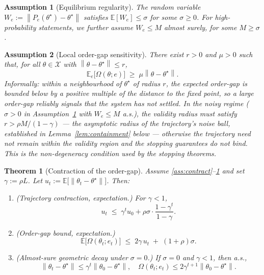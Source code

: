\documentclass[10pt,a4paper]{amsart}
\newtheorem{assumption}{Assumption}
\newtheorem{theorem}{Theorem}
\newcommand{\Ogap}{\Omega}
\newcommand{\X}{\mathcal{X}}
\newcommand{\norm}[1]{\left\lVert#1\right\rVert}
\begin{document}
\begin{assumption}[Equilibrium regularity]
\label{ass:equilibrium}
The random variable $W_e := \norm{P_e(\theta^\star) - \theta^\star}$
satisfies $\mathbb{E}[W_e] \leq \sigma$ for some $\sigma \geq 0$. For
high-probability statements, we further assume $W_e \leq M$ almost surely,
for some $M \geq \sigma$.
\end{assumption}

\begin{assumption}[Local order-gap sensitivity]
\label{ass:nondeg}
There exist $r > 0$ and $\mu > 0$ such that, for all $\theta \in \X$ with
$\norm{\theta - \theta^\star} \leq r$,
\[
  \mathbb{E}_e\bigl[\Ogap(\theta; e)\bigr] \;\geq\; \mu \norm{\theta - \theta^\star}.
\]
Informally: within a neighbourhood of $\theta^\star$ of radius $r$, the
expected order-gap is bounded below by a positive multiple of the distance to
the fixed point, so a large order-gap reliably signals that the system has not
settled. In the noisy regime ($\sigma > 0$ in
Assumption~\ref{ass:equilibrium} with $W_e \leq M$ a.s.), the validity radius
must satisfy $r > \rho M/(1-\gamma)$ — the asymptotic radius of the
trajectory's noise ball, established in Lemma~\ref{lem:containment} below —
otherwise the trajectory need not remain within the validity region and the
stopping guarantees do not bind. This is the non-degeneracy condition used
by the stopping theorems.
\end{assumption}

\begin{theorem}[Contraction of the order-gap]
\label{thm:contraction}
Assume \ref{ass:contract}--\ref{ass:equilibrium} and set $\gamma := \rho L$.
Let $u_t := \mathbb{E}\bigl[\norm{\theta_t - \theta^\star}\bigr]$. Then:
\begin{enumerate}
\item[(i)] \textnormal{(Trajectory contraction, expectation.)} For $\gamma < 1$,
\begin{equation}
\label{eq:traj_bound}
u_t \;\leq\; \gamma^t u_0 + \rho\sigma \cdot \frac{1 - \gamma^t}{1 - \gamma}.
\end{equation}
\item[(ii)] \textnormal{(Order-gap bound, expectation.)}
\begin{equation}
\label{eq:ogap_bound}
\mathbb{E}\bigl[\Ogap(\theta_t; e_t)\bigr]
\;\leq\; 2\gamma\, u_t \;+\; (1 + \rho)\sigma.
\end{equation}
\item[(iii)] \textnormal{(Almost-sure geometric decay under $\sigma = 0$.)}
If $\sigma = 0$ and $\gamma < 1$, then a.s.,
\begin{equation}
\label{eq:geom_decay_as}
\norm{\theta_t - \theta^\star} \leq \gamma^t \norm{\theta_0 - \theta^\star},
\quad
\Ogap(\theta_t; e_t) \leq 2\gamma^{t+1} \norm{\theta_0 - \theta^\star}.
\end{equation}
\end{enumerate}
\end{theorem}
\end{document}
